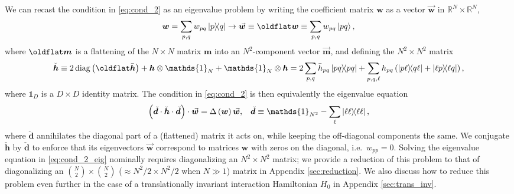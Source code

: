 \documentclass[nofootinbib,notitlepage,11pt]{revtex4-2}
\newcommand{\p}[1]{\left(#1\right)} %
\renewcommand{\c}{\cdot} %
\newcommand{\m}{\bm} %
\renewcommand{\v}{\vec} %
\newcommand{\1}{\mathds{1}}
\newcommand{\RR}{\mathbb{R}}
\DeclareMathOperator{\diag}{diag}
\let\flat\oldflat
\DeclareMathOperator{\flat}{flat}
\begin{document}
We can recast the condition in \eqref{eq:cond_2} as an eigenvalue
problem by writing the coefficient matrix $\m w$ as a vector
$\v{\m w}$ in $\RR^N\times\RR^N$,
\begin{align}
  \m w = \sum_{p,q} w_{pq} \op{p}{q}
  \to \v{\m w} \equiv \flat\m w \equiv \sum_{p,q} w_{pq} \ket{pq},
\end{align}
where $\flat\m m$ is a flattening of the $N\times N$ matrix $\m m$
into an $N^2$-component vector $\v{\m m}$, and defining the
$N^2\times N^2$ matrix
\begin{align}
  \check{\m h}
  \equiv 2\diag\p{\flat\bar{\m h}}
  + \m h\otimes\1_N + \1_N\otimes\m h
  = 2 \sum_{p,q} \bar h_{pq} \op{pq}
  + \sum_{p,q,\ell} h_{pq} \p{\op{p\ell}{q\ell} + \op{\ell p}{\ell q}},
  \label{eq:h_super_mat}
\end{align}
where $\1_D$ is a $D\times D$ identity matrix.  The condition in
\eqref{eq:cond_2} is then equivalently the eigenvalue equation
\begin{align}
  \p{\check{\m d} \c \check{\m h} \c \check{\m d}} \c \v{\m w}
  = \Delta\p{\m w} \v{\m w},
  &&
  \check{\m d} \equiv \1_{N^2} - \sum_\ell \op{\ell\ell},
  \label{eq:cond_2_eig}
\end{align}
where $\check{\m d}$ annihilates the diagonal part of a (flattened)
matrix it acts on, while keeping the off-diagonal components the same.
We conjugate $\check{\m h}$ by $\check{\m d}$ to enforce that its
eigenvectors $\v{\m w}$ correspond to matrices $\m w$ with zeros on
the diagonal, i.e.~$w_{pp}=0$.  Solving the eigenvalue equation in
\eqref{eq:cond_2_eig} nominally requires diagonalizing an
$N^2\times N^2$ matrix; we provide a reduction of this problem to that
of diagonalizing an ${N\choose2}\times{N\choose2}$
($\approx N^2/2\times N^2/2$ when $N\gg1$) matrix in Appendix
\ref{sec:reduction}.  We also discuss how to reduce this problem even
further in the case of a translationally invariant interaction
Hamiltonian $H_0$ in Appendix \ref{sec:trans_inv}.
\end{document}
